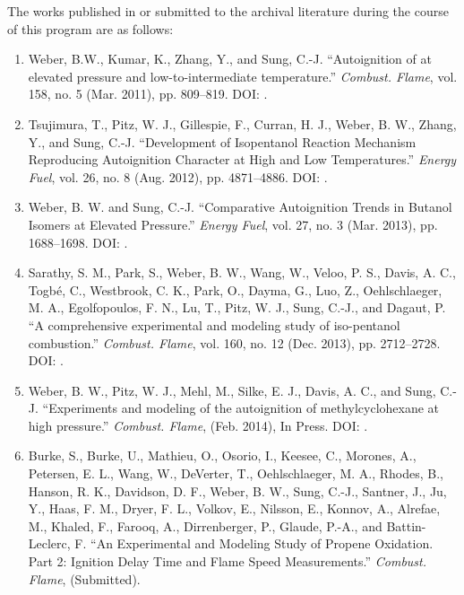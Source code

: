 \documentclass[../main.tex]{subfiles}
\begin{document}
The works published in or submitted to the archival literature during the
course of this program are as follows:
\begin{enumerate}
\item[] Weber, B.W., Kumar, K., Zhang, Y., and Sung, C.-J.
        ``Autoignition of \nBuOH{} at elevated pressure and
        low-to-intermediate temperature.'' \textit{Combust. Flame},
        vol. 158, no. 5 (Mar. 2011), pp. 809--819.
        DOI: .
\item[] Tsujimura, T., Pitz, W. J., Gillespie, F., Curran, H. J., Weber,
        B. W., Zhang, Y., and Sung, C.-J. ``Development of Isopentanol
        Reaction Mechanism Reproducing Autoignition Character at High
        and Low Temperatures.'' \textit{Energy Fuel}, vol. 26, no. 8
        (Aug. 2012), pp. 4871--4886. DOI: .
\item[] Weber, B. W. and Sung, C.-J. ``Comparative Autoignition Trends
        in Butanol Isomers at Elevated Pressure.'' \textit{Energy Fuel},
        vol. 27, no. 3 (Mar. 2013), pp. 1688--1698.
        DOI: .
\item[] Sarathy, S. M., Park, S., Weber, B. W., Wang, W., Veloo, P. S.,
        Davis, A. C., Togbé, C., Westbrook, C. K., Park, O., Dayma, G.,
        Luo, Z., Oehlschlaeger, M. A., Egolfopoulos, F. N., Lu, T.,
        Pitz, W. J., Sung, C.-J., and Dagaut, P. ``A comprehensive
        experimental and modeling study of iso-pentanol combustion.''
        \textit{Combust. Flame}, vol. 160, no. 12 (Dec. 2013),
        pp. 2712--2728. DOI: .
\item[] Weber, B. W., Pitz, W. J., Mehl, M., Silke, E. J., Davis, A. C.,
        and Sung, C.-J. ``Experiments and modeling of the autoignition
        of methylcyclohexane at high pressure.'' \textit{Combust. Flame},
        (Feb. 2014), In Press.
        DOI: .
\item[] Burke, S., Burke, U., Mathieu, O., Osorio, I., Keesee, C.,
        Morones, A., Petersen, E. L., Wang, W., DeVerter, T.,
        Oehlschlaeger, M. A., Rhodes, B., Hanson, R. K., Davidson, D. F.,
        Weber, B. W., Sung, C.-J., Santner, J., Ju, Y., Haas, F. M.,
        Dryer, F. L., Volkov, E., Nilsson, E., Konnov, A., Alrefae, M.,
        Khaled, F., Farooq, A., Dirrenberger, P., Glaude, P.-A., and
        Battin-Leclerc, F. ``An Experimental and Modeling Study of
        Propene Oxidation. Part 2: Ignition Delay Time and Flame Speed
        Measurements.'' \textit{Combust. Flame}, (Submitted).
\end{enumerate}
\end{document}
